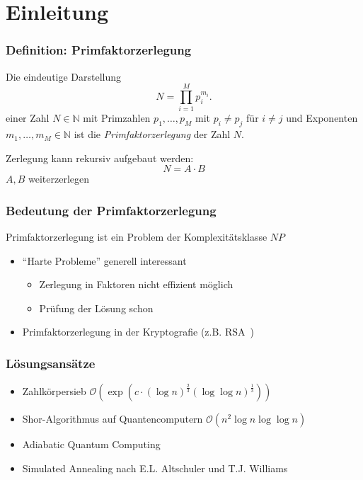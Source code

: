 \section{Einleitung}

\begin{frame}
  \frametitle{Definition: Primfaktorzerlegung}
  \begin{definition}
    Die eindeutige Darstellung
    \begin{equation*}
      N=\prod\limits_{i=1}^M p_i^{m_i}.
    \end{equation*}
    einer Zahl $N\in\mathbb{N}$ mit Primzahlen $p_1,\dots,p_M$ mit $p_i \neq p_j$ für $i \neq j$ und Exponenten $m_1,\dots,m_M\in\mathbb{N}$ ist die \textit{Primfaktorzerlegung} der Zahl $N$.
  \end{definition}
  \pause{}

  Zerlegung kann rekursiv aufgebaut werden:
  \begin{equation*}
    N=A\cdot B
  \end{equation*}
  \Rightarrow{} $A, B$ weiterzerlegen
\end{frame}

\begin{frame}
  \frametitle{Bedeutung der Primfaktorzerlegung}
  Primfaktorzerlegung ist ein Problem der Komplexitätsklasse $NP$
  \begin{itemize}
    \item ``Harte Probleme'' generell interessant
      \begin{itemize}
        \item Zerlegung in Faktoren nicht effizient möglich
        \item Prüfung der Lösung schon
      \end{itemize}
    \item Primfaktorzerlegung in der Kryptografie (z.B. RSA~\cite{rsa})
  \end{itemize}
\end{frame}

\begin{frame}
  \frametitle{Lösungsansätze}
  \begin{itemize}
    \setlength{\itemsep}{5pt}
    \item Zahlkörpersieb $\mathcal{O}\left(\exp\left(c\cdot {\left(\log n\right)}^{\frac{2}{3}}{\left(\log\log n\right)}^{\frac{1}{3}}\right)\right)$~\cite{pomerance}
    \item Shor-Algorithmus auf Quantencomputern $\mathcal{O}\left(n^2 \log n \log\log n\right)$~\cite{shor}
    \item Adiabatic Quantum Computing~\cite{suter,xu}
    \item Simulated Annealing nach E.L. Altschuler und T.J. Williams~\cite{altschuler}
  \end{itemize}
\end{frame}
